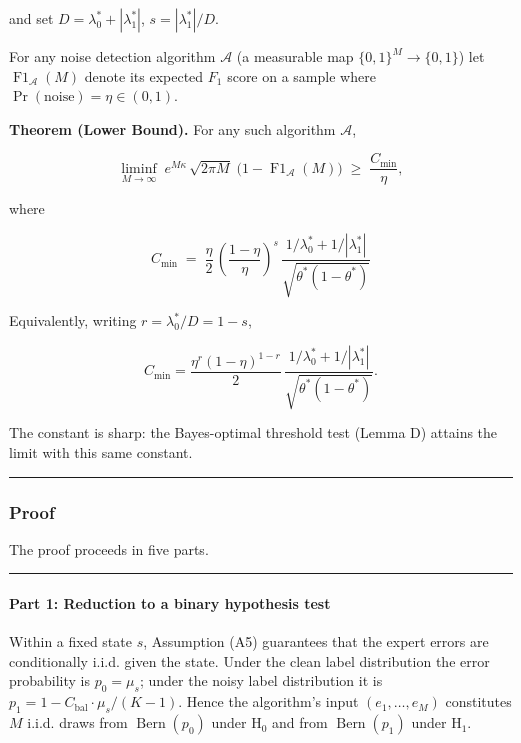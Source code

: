 \documentclass[12pt]{article}
\begin{document}
and set \(D = \lambda_0^* + |\lambda_1^*|\), \(s = |\lambda_1^*|/D\).

For any noise detection algorithm \(\mathcal{A}\) (a measurable map
\(\{0,1\}^M \to \{0,1\}\)) let \(\operatorname{F1}_{\mathcal{A}}(M)\)
denote its expected \(F_1\) score on a sample where
\(\Pr(\text{noise})=\eta \in (0,1)\).

\textbf{Theorem (Lower Bound).} For any such algorithm \(\mathcal{A}\),

\[
\liminf_{M\to\infty} \; e^{M\kappa}\,\sqrt{2\pi M}\; \bigl(1-\operatorname{F1}_{\mathcal{A}}(M)\bigr) \;\ge\; \frac{C_{\min}}{\eta},
\]

where

\[
\boxed{\;C_{\min} \;=\; \frac{\eta}{2}\,\left(\frac{1-\eta}{\eta}\right)^{\!s}\,
\frac{1/\lambda_0^* + 1/|\lambda_1^*|}{\sqrt{\theta^*(1-\theta^*)}}\;}
\]

Equivalently, writing \(r = \lambda_0^*/D = 1-s\),

\[
C_{\min} = \frac{\eta^r (1-\eta)^{1-r}}{2}\,
\frac{1/\lambda_0^* + 1/|\lambda_1^*|}{\sqrt{\theta^*(1-\theta^*)}}.
\]

The constant is sharp: the Bayes-optimal threshold test (Lemma D)
attains the limit with this same constant.

\begin{center}\rule{0.5\linewidth}{0.5pt}\end{center}

\subsubsection{Proof}\label{proof}

The proof proceeds in five parts.

\begin{center}\rule{0.5\linewidth}{0.5pt}\end{center}

\paragraph{Part 1: Reduction to a binary hypothesis
test}\label{part-1-reduction-to-a-binary-hypothesis-test}

Within a fixed state \(s\), Assumption (A5) guarantees that the expert
errors are conditionally i.i.d. given the state. Under the clean label
distribution the error probability is \(p_0 = \mu_s\); under the noisy
label distribution it is \(p_1 = 1 - C_{\text{bal}}\cdot\mu_s/(K-1)\).
Hence the algorithm's input \((e_1,\dots,e_M)\) constitutes \(M\) i.i.d.
draws from \(\operatorname{Bern}(p_0)\) under \(\mathrm{H}_0\) and from
\(\operatorname{Bern}(p_1)\) under \(\mathrm{H}_1\).
\end{document}
